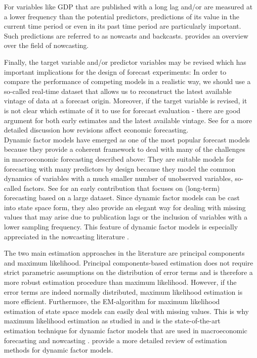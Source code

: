 For variables like GDP that are published with a long lag and/or are measured at a lower frequency than the potential predictors, predictions of its value in the current time period or even in its past time period are particularly important. Such predictions are referred to as nowcasts and backcasts. \citet{BanburaEtal2013} provides an overview over the field of nowcasting. %

Finally, the target variable and/or predictor variables may be revised which has important implications for the design of forecast experiments: In order to compare the performance of competing models in a realistic way, we should use a so-called real-time dataset that allows us to reconstruct the latest available vintage of data at a forecast origin. Moreover, if the target variable is revised, it is not clear which estimate of it to use for forecast evaluation - there are good argument for both early estimates and the latest available vintage. See \citet{Croushore2011} for a more detailed discussion how revisions affect economic forecasting.\\


Dynamic factor models have emerged as one of the most popular forecast models because they provide a coherent framework to deal with many of the challenges in macroeconomic forecasting described above: They are suitable models for forecasting with many predictors by design because they model the common dynamics of variables with a much smaller number of unobserved variables, so-called factors. See \citet{StockWatson2002} for an early contribution that focuses on (long-term) forecasting based on a large dataset. Since dynamic factor models can be cast into state space form, they also provide an elegant way for dealing with missing values that may arise due to publication lags or the inclusion of variables with a lower sampling frequency. This feature of dynamic factor models is especially appreciated in the nowcasting literature \citep{GiannoneEtal2008, BanburaEtal2013}.

The two main estimation approaches in the literature are principal components and maximum likelihood. Principal components-based estimation does not require strict parametric assumptions on the distribution of error terms and is therefore a more robust estimation procedure than maximum likelihood. However, if the error terms are indeed normally distributed, maximum likelihood estimation is more efficient. Furthermore, the EM-algorithm for maximum likelihood estimation of state space models can easily deal with missing values. This is why maximum likelihood estimation as studied in \citet{DozEtal2012} and \citet{BanburaModugno2014} is the state-of-the-art estimation technique for dynamic factor models that are used in macroeconomic forecasting and nowcasting \citep[for example, see][for a description of model of the Federal Reserve Bank of New York for nowcasting real GDP growth]{BokEtal2017}. \citet{StockWatson2006} provide a more detailed review of estimation methods for dynamic factor models.

